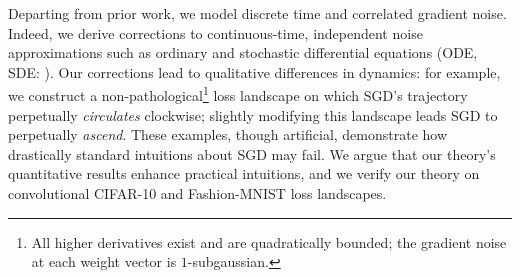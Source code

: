 \documentclass[anon,12pt]{colt2021} %
\begin{document}
            Departing from prior work, we model discrete time and correlated
            gradient noise.  Indeed, we derive corrections to continuous-time,
            independent noise approximations such as ordinary and stochastic
            differential equations (ODE, SDE: \cite{li18}).
            Our corrections lead to qualitative differences in dynamics: for
            example, we construct a non-pathological\footnote{%
                All higher derivatives exist and are quadratically bounded; the
                gradient noise at each weight vector is $1$-subgaussian.%
            } loss landscape on which SGD's trajectory perpetually
            \emph{circulates} clockwise; slightly modifying this
            landscape leads SGD to perpetually \emph{ascend}.
            These examples, though artificial, demonstrate how drastically
            standard intuitions about SGD may fail.  We argue that our theory's
            quantitative results enhance practical intuitions, and we verify
            our theory on convolutional CIFAR-10 and Fashion-MNIST loss
            landscapes.
\end{document}
